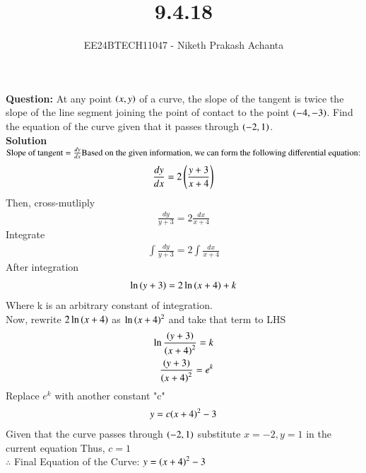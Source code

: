 \documentclass[journal]{IEEEtran}
\renewcommand{\thefigure}{\theenumi}
\renewcommand{\thetable}{\theenumi}
\numberwithin{equation}{enumi}
\numberwithin{figure}{enumi}
\renewcommand{\thetable}{\theenumi}
\begin{document}

\vspace{3cm}

\title{9.4.18}
\author{EE24BTECH11047 - Niketh Prakash Achanta}
{\let\newpage\relax\maketitle}
\renewcommand{\thefigure}{\theenumi}
\renewcommand{\thetable}{\theenumi}
\textbf{Question:} At any point $\left(x,y\right)$ of a curve, the slope of the tangent is twice the slope of the line segment joining the point of contact to the point $\left(-4,-3\right)$. Find the equation of the curve given that it passes through $\left(-2,1\right)$.\\

\textbf{Solution}\\
    $\text{Slope of tangent} = \frac{dy}{dx}\\ 
    \text{Based on the given information, we can form the following differential equation:}$ \\
    \begin{align*}
    \frac{dy}{dx}=2\left(\frac{y+3}{x+4}\right)     
    \end{align*}
Then, cross-mutliply 
    \begin{align*}
        \frac{dy}{y+3}=2\frac{dx}{x+4}
    \end{align*}
Integrate
    \begin{align*}
        \int{\frac{dy}{y+3}}=2\int{\frac{dx}{x+4}}
    \end{align*}
After integration
    \begin{align*}
        \ln{\ensuremath{\left(y+3\right)}}=2\ln{\ensuremath{\left(x+4\right)}}+k    
    \end{align*}
Where k is an arbitrary constant of integration.\\
Now, rewrite $2\ln{\ensuremath{\left(x+4\right)}}$ as ${\ln{\ensuremath{\left(x+4\right)}}}^2$ and take that term to LHS
    \begin{align*}
        \ln{\frac{\ensuremath{\left(y+3\right)}}{{\ensuremath{\left(x+4\right)}}^2}}=k\\
        \frac{\left(y+3\right)}{{\left(x+4\right)}^2}={e}^k
    \end{align*}
Replace $e^k$ with another constant "c"
    \begin{align*}
        y=c{\left(x+4\right)}^2 - 3
    \end{align*}
Given that the curve passes through $\left(-2,1\right)$ substitute $x=-2,y=1$ in the current equation
Thus, $c=1$\\
$\therefore$ Final Equation of the Curve: $y={\left(x+4\right)}^2 - 3$
\end{document}

